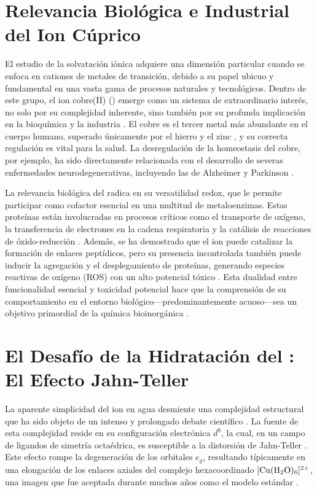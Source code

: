 
\section{Relevancia Biológica e Industrial del Ion Cúprico}

El estudio de la solvatación iónica adquiere una dimensión particular cuando se enfoca en cationes de metales de transición, debido a su papel ubicuo y fundamental en una vasta gama de procesos naturales y tecnológicos. Dentro de este grupo, el ion cobre(II) () emerge como un sistema de extraordinario interés, no solo por su complejidad inherente, sino también por su profunda implicación en la bioquímica y la industria \cite{Wa-2012-01}. El cobre es el tercer metal más abundante en el cuerpo humano, superado únicamente por el hierro y el zinc \cite{Me-2012-01}, y su correcta regulación es vital para la salud. La desregulación de la homeostasis del cobre, por ejemplo, ha sido directamente relacionada con el desarrollo de severas enfermedades neurodegenerativas, incluyendo las de Alzheimer y Parkinson \cite{Cu-2015-01, Me-2022-01, Wa-2018-01, Wa-2024-03}.

La relevancia biológica del  radica en su versatilidad redox, que le permite participar como cofactor esencial en una multitud de metaloenzimas. Estas proteínas están involucradas en procesos críticos como el transporte de oxígeno, la transferencia de electrones en la cadena respiratoria y la catálisis de reacciones de óxido-reducción \cite{Cu-2015-01, Me-2022-01, Wa-2009-01, Wa-2016-01}. Además, se ha demostrado que el ion  puede catalizar la formación de enlaces peptídicos, pero su presencia incontrolada también puede inducir la agregación y el desplegamiento de proteínas, generando especies reactivas de oxígeno (ROS) con un alto potencial tóxico \cite{Wa-2009-01, Wa-2016-01}. Esta dualidad entre funcionalidad esencial y toxicidad potencial hace que la comprensión de su comportamiento en el entorno biológico—predominantemente acuoso—sea un objetivo primordial de la química bioinorgánica \cite{Wa-2018-01}.

\section{El Desafío de la Hidratación del : El Efecto Jahn-Teller}

La aparente simplicidad del ion  en agua desmiente una complejidad estructural que ha sido objeto de un intenso y prolongado debate científico \cite{Cu-2011-01, Wa-2002-01}. La fuente de esta complejidad reside en su configuración electrónica $d^9$, la cual, en un campo de ligandos de simetría octaédrica, es susceptible a la distorsión de Jahn-Teller \cite{Cu-2011-01, Wa-2001-01, Cu-2004-01, Wa-2008-02, Wa-2009-02, Wa-2020-01}. Este efecto rompe la degeneración de los orbitales $e_g$, resultando típicamente en una elongación de los enlaces axiales del complejo hexacoordinado $[\ce{Cu(H2O)6}]^{2+}$, una imagen que fue aceptada durante muchos años como el modelo estándar \cite{Wa-2007-02, Wa-2018-02}.

